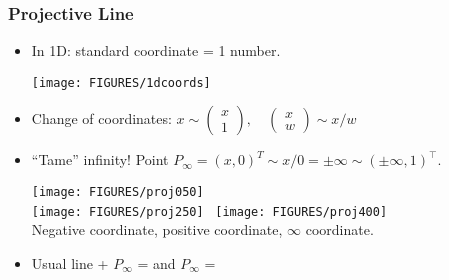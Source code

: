 \documentclass[9pt]{beamer}
\newcommand{\myemph}[1]{{\color{blue}{#1}}}
\begin{document}



\begin{frame}
  \frametitle{Projective Line}
  \begin{itemize}
  \item In 1D: standard  coordinate = 1 number. 
    \begin{center}
      \texttt{[image: FIGURES/1dcoords]}
    \end{center}
  \item Change of coordinates:
    $x\sim
    \begin{pmatrix}
      x\\1
    \end{pmatrix},\quad
    \begin{pmatrix}
      x\\w
    \end{pmatrix}\sim x/w 
    $
  \item ``Tame'' infinity! Point $P_\infty = (x,0)^T \sim x/0 = \pm\infty \sim (\pm\infty,1)^\top$.
    \begin{center}
      \texttt{[image: FIGURES/proj050]}\\
      \texttt{[image: FIGURES/proj250]}~
      \texttt{[image: FIGURES/proj400]}\\
      Negative coordinate,
      positive coordinate, $\infty$ coordinate.
    \end{center}
  \item Usual line + $P_\infty$ = \myemph{Projective Line $\PP^1$} and $P_\infty$ = \myemph{Point at Infinity}
  \end{itemize}
\end{frame}
\end{document}
